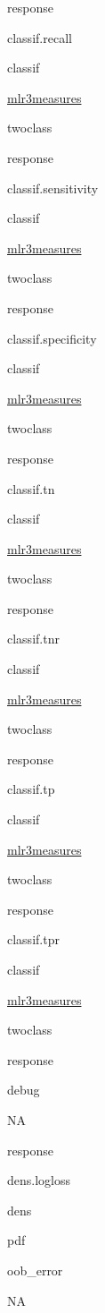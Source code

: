 \documentclass[]{article}
\begin{document}
response

classif.recall

classif

\href{https://cran.r-project.org/package=mlr3measures}{mlr3measures}

twoclass

response

classif.sensitivity

classif

\href{https://cran.r-project.org/package=mlr3measures}{mlr3measures}

twoclass

response

classif.specificity

classif

\href{https://cran.r-project.org/package=mlr3measures}{mlr3measures}

twoclass

response

classif.tn

classif

\href{https://cran.r-project.org/package=mlr3measures}{mlr3measures}

twoclass

response

classif.tnr

classif

\href{https://cran.r-project.org/package=mlr3measures}{mlr3measures}

twoclass

response

classif.tp

classif

\href{https://cran.r-project.org/package=mlr3measures}{mlr3measures}

twoclass

response

classif.tpr

classif

\href{https://cran.r-project.org/package=mlr3measures}{mlr3measures}

twoclass

response

debug

NA

response

dens.logloss

dens

pdf

oob\_error

NA
\end{document}
